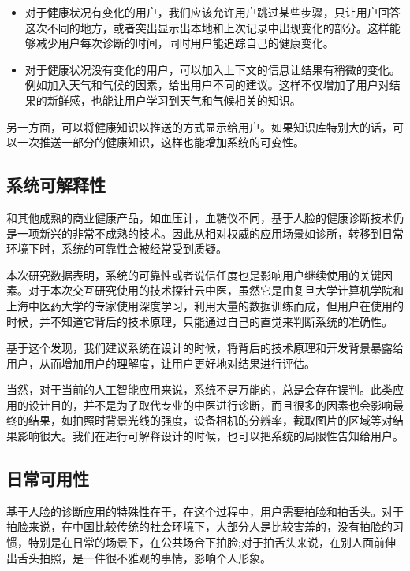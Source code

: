 \begin{itemize}

    \item 对于健康状况有变化的用户，我们应该允许用户跳过某些步骤，只让用户回答这次不同的地方，或者突出显示出本地和上次记录中出现变化的部分。这样能够减少用户每次诊断的时间，同时用户能追踪自己的健康变化。

    \item 对于健康状况没有变化的用户，可以加入上下文的信息让结果有稍微的变化。例如加入天气和气候的因素，给出用户不同的建议。这样不仅增加了用户对结果的新鲜感，也能让用户学习到天气和气候相关的知识。

\end{itemize}

另一方面，可以将健康知识以推送的方式显示给用户。如果知识库特别大的话，可以一次推送一部分的健康知识，这样也能增加系统的可变性。

\subsection{系统可解释性}

和其他成熟的商业健康产品，如血压计，血糖仪不同，基于人脸的健康诊断技术仍是一项新兴的非常不成熟的技术。因此从相对权威的应用场景如诊所，转移到日常环境下时，系统的可靠性会被经常受到质疑。

本次研究数据表明，系统的可靠性或者说信任度也是影响用户继续使用的关键因素。对于本次交互研究使用的技术探针云中医，虽然它是由复旦大学计算机学院和上海中医药大学的专家使用深度学习，利用大量的数据训练而成，但用户在使用的时候，并不知道它背后的技术原理，只能通过自己的直觉来判断系统的准确性。

基于这个发现，我们建议系统在设计的时候，将背后的技术原理和开发背景暴露给用户，从而增加用户的理解度，让用户更好地对结果进行评估。

当然，对于当前的人工智能应用来说，系统不是万能的，总是会存在误判。此类应用的设计目的，并不是为了取代专业的中医进行诊断，而且很多的因素也会影响最终的结果，如拍照时背景光线的强度，设备相机的分辨率，截取图片的区域等对结果影响很大。我们在进行可解释设计的时候，也可以把系统的局限性告知给用户。

\subsection{日常可用性}
基于人脸的诊断应用的特殊性在于，在这个过程中，用户需要拍脸和拍舌头。对于拍脸来说，在中国比较传统的社会环境下，大部分人是比较害羞的，没有拍脸的习惯，特别是在日常的场景下，在公共场合下拍脸;对于拍舌头来说，在别人面前伸出舌头拍照，是一件很不雅观的事情，影响个人形象。

